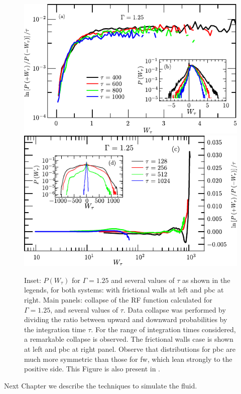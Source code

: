 \begin{figure}[H]
    \centering
    \includegraphics[width = 0.65\linewidth]{04-figuras/BNE_LDF_FW.pdf} \\
    \includegraphics[width = 0.65\linewidth]{04-figuras/BNE_LDF_PBC.pdf}
    \caption[BNE with periodic boundary: large deviation.]{Inset: $P(W_\tau)$ for $\Gamma = 1.25$ and several values of $\tau$ as shown in the legends, for both systems: with frictional walls at left and pbc at right. Main panels: collapse of the RF function calculated for $\Gamma = 1.25$, and several values of $ \tau$.  Data collapse was performed by dividing the ratio between upward and downward probabilities by the integration time $\tau$. For the range of integration times considered, a remarkable collapse is observed. The frictional walls case is shown at left and pbc at right panel. Observe that distributions for pbc are much more symmetric than those for fw, which lean strongly to the positive side. This Figure is also present in \cite{Large-deviation_quantification_of_boundary_conditions_on_the_Brazil_nut_effect}.}
    \label{fig:LDFgamma}
\end{figure}

    Next Chapter we describe the techniques to simulate the fluid.

